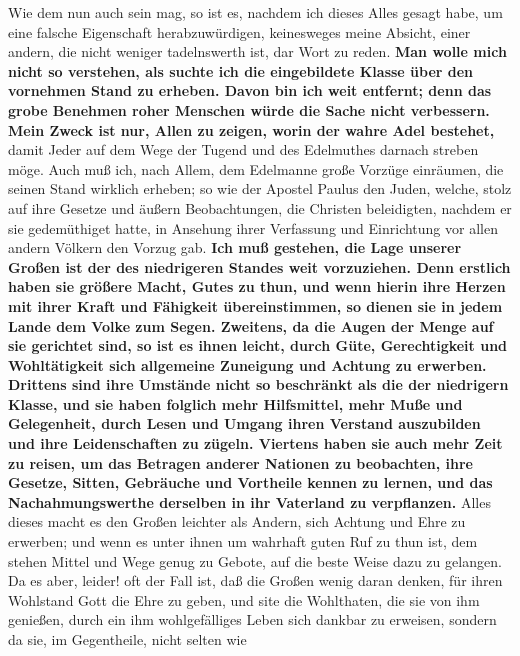 Wie dem nun auch sein mag, so ist es, nachdem ich dieses Alles gesagt habe, um
eine falsche Eigenschaft herabzuwürdigen, keinesweges meine Absicht, einer
andern, die nicht weniger tadelnswerth ist, dar Wort zu reden. \textbf{Man wolle
mich
nicht so verstehen, als suchte ich die eingebildete
Klasse über den vornehmen
Stand zu erheben. Davon bin ich weit entfernt; denn das grobe
Benehmen roher
Menschen würde die Sache nicht verbessern. Mein Zweck ist nur, Allen zu zeigen,
worin der wahre Adel bestehet,} damit Jeder auf dem Wege der Tugend und des
Edelmuthes darnach streben möge. Auch muß ich, nach Allem, dem Edelmanne große
Vorzüge einräumen, die seinen Stand wirklich erheben; so wie der Apostel
Paulus
den Juden, welche, stolz auf ihre Gesetze und äußern
Beobachtungen, die Christen
beleidigten, nachdem er sie gedemüthiget hatte, in Ansehung ihrer Verfassung und
Einrichtung vor allen andern Völkern den Vorzug gab.
\label{ref:11_07_standesvorteil} \textbf{Ich muß gestehen, die Lage
unserer  Großen ist der des niedrigeren
Standes weit vorzuziehen. Denn erstlich
haben sie größere Macht, Gutes zu thun, und wenn hierin ihre Herzen mit ihrer
Kraft und Fähigkeit übereinstimmen, so dienen sie in jedem Lande dem Volke zum
Segen. Zweitens, da die Augen der Menge auf sie gerichtet sind, so ist es ihnen
leicht, durch Güte, Gerechtigkeit und Wohltätigkeit sich
allgemeine Zuneigung
und Achtung zu erwerben. Drittens sind ihre Umstände nicht so beschränkt als die
der niedrigern Klasse, und sie haben folglich mehr Hilfsmittel, mehr
Muße und
Gelegenheit, durch Lesen und Umgang ihren Verstand
auszubilden und ihre
Leidenschaften zu zügeln. Viertens haben sie auch mehr Zeit zu
reisen, um das
Betragen anderer Nationen zu beobachten, ihre Gesetze, Sitten, Gebräuche und
Vortheile kennen zu lernen, und das Nachahmungswerthe derselben in ihr Vaterland
zu verpflanzen.} Alles dieses macht es den Großen leichter als Andern, sich
Achtung und Ehre zu erwerben; und wenn es unter ihnen um wahrhaft guten Ruf zu
thun ist, dem stehen Mittel und Wege genug zu Gebote, auf die beste Weise dazu
zu gelangen. Da es aber, leider! oft der Fall ist, daß die Großen wenig daran
denken, für ihren Wohlstand Gott die Ehre zu geben, und site die Wohlthaten, die
sie von ihm genießen, durch ein ihm wohlgefälliges Leben sich dankbar zu
erweisen, sondern da sie, im Gegentheile, nicht selten wie
